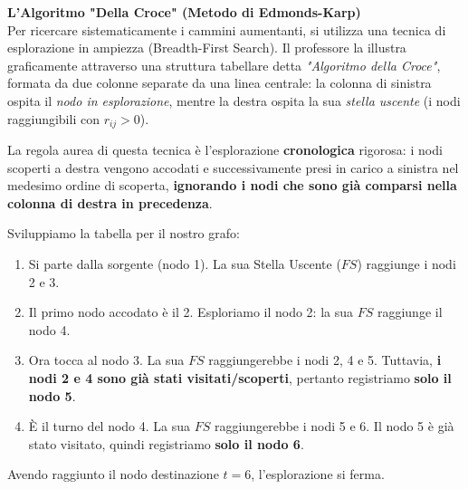 \documentclass[12pt, a4paper]{article}
\begin{document}
	\textbf{L'Algoritmo "Della Croce" (Metodo di Edmonds-Karp)}\\
	Per ricercare sistematicamente i cammini aumentanti, si utilizza una tecnica di esplorazione in ampiezza (Breadth-First Search). Il professore la illustra graficamente attraverso una struttura tabellare detta \textit{"Algoritmo della Croce"}, formata da due colonne separate da una linea centrale: la colonna di sinistra ospita il \textit{nodo in esplorazione}, mentre la destra ospita la sua \textit{stella uscente} (i nodi raggiungibili con $r_{ij} > 0$).
	
	La regola aurea di questa tecnica è l'esplorazione \textbf{cronologica} rigorosa: i nodi scoperti a destra vengono accodati e successivamente presi in carico a sinistra nel medesimo ordine di scoperta, \textbf{ignorando i nodi che sono già comparsi nella colonna di destra in precedenza}.
	
	Sviluppiamo la tabella per il nostro grafo:
	\begin{enumerate}
		\item Si parte dalla sorgente (nodo 1). La sua Stella Uscente ($FS$) raggiunge i nodi 2 e 3.
		\item Il primo nodo accodato è il 2. Esploriamo il nodo 2: la sua $FS$ raggiunge il nodo 4.
		\item Ora tocca al nodo 3. La sua $FS$ raggiungerebbe i nodi 2, 4 e 5. Tuttavia, \textbf{i nodi 2 e 4 sono già stati visitati/scoperti}, pertanto registriamo \textbf{solo il nodo 5}.
		\item È il turno del nodo 4. La sua $FS$ raggiungerebbe i nodi 5 e 6. Il nodo 5 è già stato visitato, quindi registriamo \textbf{solo il nodo 6}.
	\end{enumerate}
	Avendo raggiunto il nodo destinazione $t=6$, l'esplorazione si ferma.
	
\end{document}
